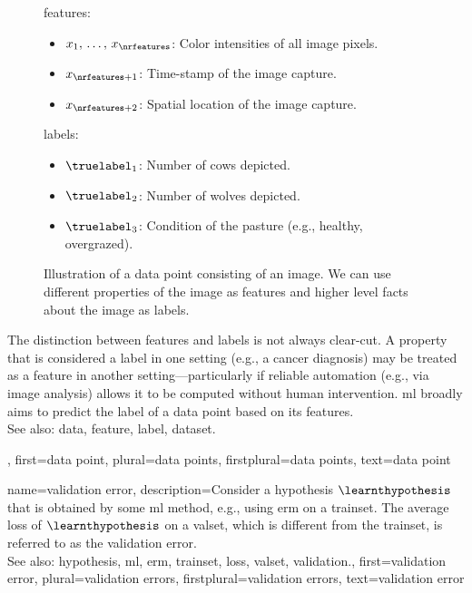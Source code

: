 {{\begin{figure}[H]
\begin{minipage}[t]{0.95\textwidth}
        			\Glspl{feature}:
        			\begin{itemize}
            			\item $x_{1}, \,\ldots, \,x_{\nrfeatures}$: Color intensities of all image pixels.
            			\item $x_{\nrfeatures+1}$: Time-stamp of the image capture.
            			\item $x_{\nrfeatures+2}$: Spatial location of the image capture.
			\end{itemize}
			\Glspl{label}:
            		\begin{itemize}
               	 		\item $\truelabel_{1}$: Number of cows depicted. 
                			\item $\truelabel_{2}$: Number of wolves depicted. 
                			\item $\truelabel_{3}$: Condition of the pasture (e.g., healthy, overgrazed).
            		\end{itemize}
    			\end{minipage}
    		\caption{Illustration of a \gls{data} point consisting of an image. We can use 
			different properties of the image as \glspl{feature} and higher level facts
			about the image as \glspl{label}.\label{fig:datapoint_cowherd_dict}}
		\end{figure}
 		The distinction between \glspl{feature} and \glspl{label} is not always clear-cut. 
 		A property that is considered a \gls{label} in one setting (e.g., a cancer diagnosis) 
 		may be treated as a \gls{feature} in another setting—particularly if reliable automation (e.g., 
 		via image analysis) allows it to be computed without human intervention.
   		\Gls{ml} broadly aims to predict the \gls{label} of a \gls{data} point based on its \glspl{feature}. 
				\\
		See also: \gls{data}, \gls{feature}, \gls{label}, \gls{dataset}.}, 
	first={data point},
	plural={data points},
	firstplural={data points},
	text={data point}  
}

{name={validation error},
 	description={Consider a \gls{hypothesis} $\learnthypothesis$ that is 
 		obtained by some \gls{ml} method, e.g., using \gls{erm} on a \gls{trainset}. The average \gls{loss} 
 		of $\learnthypothesis$ on a \gls{valset}, which is different from the \gls{trainset}, is referred 
 		to as the \gls{validation} error.
			\\
		See also: \gls{hypothesis}, \gls{ml}, \gls{erm}, \gls{trainset}, \gls{loss}, \gls{valset}, \gls{validation}.},
	first={validation error},
	plural={validation errors},
	firstplural={validation errors},
	text={validation error}  
}

